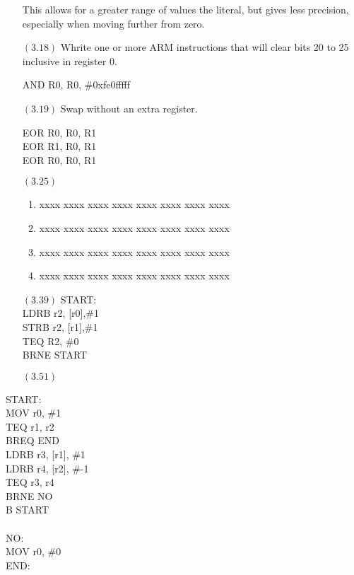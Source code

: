 \documentclass[letterpaper,10pt,titlepage]{article}
\begin{document}
\begin{enumerate}
This allows for a greater range of values the literal, but gives less precision, especially when moving further from zero.
\item[$(3.18)$] Whrite one or more ARM instructions that will clear bits 20 to 25 inclusive in register 0.

AND R0, R0, \#0xfe0fffff
\item[$(3.19)$]Swap without an extra register.

EOR R0, R0, R1 \\
EOR R1, R0, R1 \\ 
EOR R0, R0, R1 \\
\item[$(3.25)$]

\begin{enumerate}
\item xxxx xxxx xxxx xxxx xxxx xxxx xxxx xxxx
\item xxxx xxxx xxxx xxxx xxxx xxxx xxxx xxxx
\item xxxx xxxx xxxx xxxx xxxx xxxx xxxx xxxx
\item xxxx xxxx xxxx xxxx xxxx xxxx xxxx xxxx
\end{enumerate}
\item[$(3.39)$]
START: \\
LDRB r2, [r0],\#1 \\
STRB r2, [r1],\#1 \\
TEQ R2, \#0 \\
BRNE START \\

\item[$(3.51)$]	 
\end{enumerate}
START:\\
MOV r0, \#1 \\
TEQ r1, r2 \\
BREQ END \\
LDRB r3, [r1], \#1 \\
LDRB r4, [r2], \#-1 \\
TEQ r3, r4 \\
BRNE NO \\
B START \\
\\
NO:\\
MOV r0, \#0 \\
END: \\
\end{document}
